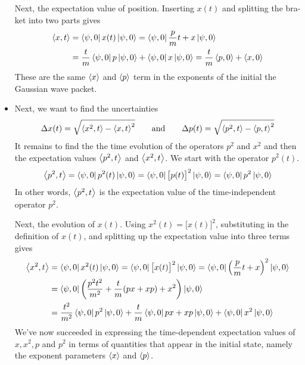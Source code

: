 \documentclass[11pt, a4paper]{article}
\newcommand{\eqtext}[1]{\qquad \text{#1} \qquad}
\begin{document}
\begin{itemize}
	Next, the expectation value of position. Inserting $ x(t) $  and splitting the bra-ket into two parts gives
	\begin{align*}
		\ev{x, t} &= \bra{\psi, 0} x(t) \ket{\psi, 0} = \bra{\psi, 0} \frac{p}{m}t + x \ket{\psi, 0} \\
		&= \frac{t}{m}\bra{\psi, 0} p \ket{\psi, 0} + \bra{\psi, 0} x \ket{\psi, 0} = \frac{t}{m}\ev{p, 0} + \ev{x, 0}
	\end{align*}
	These are the same  $ \ev{x} $ and $ \ev{p} $ term in the exponents of the initial the Gaussian wave packet. 
	
	\item Next, we want to find the uncertainties
	\begin{equation*}
		\Delta x(t) = \sqrt{\ev{x^{2}, t} - \ev{x, t}^{2}} \eqtext{and} \Delta p(t) = \sqrt{\ev{p^{2}, t} - \ev{p, t}^{2}}
	\end{equation*}
	It remains to find the the time evolution of the operators $ p^{2} $ and $ x^{2} $ and then the expectation values $ \ev{p^{2}, t} $ and $ \ev{x^{2}, t} $. We start with the operator $ p^{2}(t) $. 
	\begin{equation*}
		\ev{p^{2}, t} = \bra{\psi, 0} p^{2}(t) \ket{\psi, 0} = \bra{\psi, 0} \big[p(t)\big]^{2} \ket{\psi, 0} = \bra{\psi, 0} p^{2} \ket{\psi, 0}
	\end{equation*}
	In other words, $ \ev{p^{2}, t} $ is the expectation value of the time-independent operator $ p^{2} $. 
	
	Next, the evolution of $ x(t) $. Using $ x^{2}(t) = \big[x(t)\big]^{2} $, substituting in the definition of $ x(t) $, and splitting up the expectation value into three terms gives
	\begin{align*}
		\ev{x^{2}, t} &= \bra{\psi, 0} x^{2}(t) \ket{\psi, 0} =  \bra{\psi, 0} \big[x(t)\big]^{2} \ket{\psi, 0} = \bra{\psi, 0}\left(\frac{p}{m}t + x\right)^{2} \ket{\psi, 0}\\
		&= \bra{\psi, 0}\left(\frac{p^{2}t^{2}}{m^{2}} + \frac{t}{m}(px + xp) + x^{2}\right)\ket{\psi, 0}\\
		&= \frac{t^{2}}{m^{2}}\bra{\psi, 0} p^{2} \ket{\psi, 0} + \frac{t}{m}\bra{\psi, 0} px + xp \ket{\psi, 0} + \bra{\psi, 0} x^{2} \ket{\psi, 0}
	\end{align*}
	We've now succeeded in expressing the time-dependent expectation values of $ x, x^{2}, p $ and $ p^{2} $ in terms of quantities that appear in the initial state, namely the exponent parameters $ \ev{x} $ and $ \ev{p} $. 
	

\end{itemize}
\end{document}
